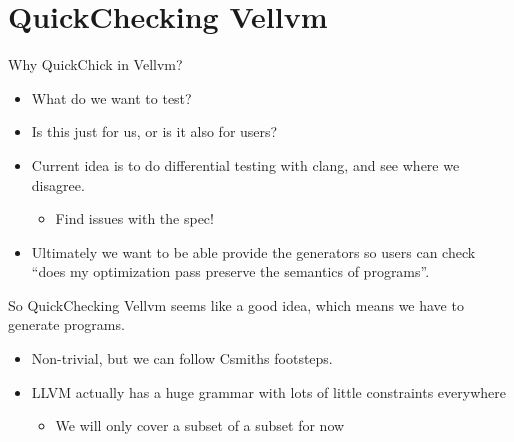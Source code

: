 \documentclass{beamer}
\begin{document}

\section{QuickChecking Vellvm}

\begin{frame}
  Why QuickChick in Vellvm?

  \begin{itemize}
  \item What do we want to test?
  \item Is this just for us, or is it also for users?
  \item Current idea is to do differential testing with clang, and see
    where we disagree.
    \begin{itemize}
    \item Find issues with the spec!
    \end{itemize}
  \item Ultimately we want to be able provide the generators so users
    can check ``does my optimization pass preserve the semantics of programs''.
  \end{itemize}
\end{frame}

\begin{frame}
  So QuickChecking Vellvm seems like a good idea, which means we have
  to generate programs.

  \begin{itemize}
  \item Non-trivial, but we can follow Csmiths footsteps.
  \item LLVM actually has a huge grammar with lots of little
    constraints everywhere
    \begin{itemize}
    \item We will only cover a subset of a subset for now
    \end{itemize}
  \end{itemize}
\end{frame}
\end{document}
